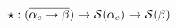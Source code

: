 \documentclass[preview]{standalone}
\begin{document}
\begin{equation*}
  \star : (\overline{\alpha_e \rightarrow \beta}) \rightarrow \mathcal{S}(\alpha_e) \rightarrow \mathcal{S}(\beta)
\end{equation*}
\end{document}
